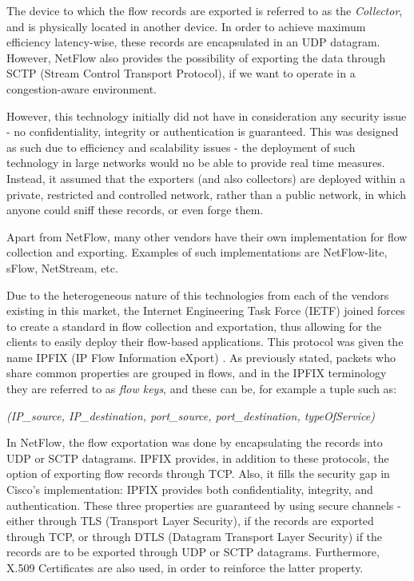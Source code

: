 \documentclass[runningheads,a4paper]{llncs}
\begin{document}
The device to which the flow records are exported is referred to as the \textit{Collector}, and is physically located in another device. In order to achieve maximum efficiency latency-wise, these records are encapsulated in an UDP datagram. However, NetFlow also provides the possibility of exporting the data through SCTP (Stream Control Transport Protocol), if we want to operate in a congestion-aware environment.


However, this technology initially did not have in consideration any security issue - no confidentiality, integrity or authentication is guaranteed. This was designed as such due to efficiency and scalability issues - the deployment of such technology in large networks would no be able to provide real time measures. Instead, it assumed that the exporters (and also collectors) are deployed within a private, restricted and controlled network, rather than a public network, in which anyone could sniff these records, or even forge them.


Apart from NetFlow, many other vendors have their own implementation for flow collection and exporting. Examples of such implementations are NetFlow-lite, sFlow, NetStream, etc.


Due to the heterogeneous nature of this technologies from each of the vendors existing in this market, the Internet Engineering Task Force (IETF) joined forces to create a standard in flow collection and exportation, thus allowing for the clients to easily deploy their flow-based applications. This protocol was given the name IPFIX (IP Flow Information eXport) \cite{Claise2013}. As previously stated, packets who share common properties are grouped in flows, and in the IPFIX terminology they are referred to as \textit{flow keys}, and these can be, for example a tuple such as:


\emph{(IP\_source, IP\_destination, port\_source, port\_destination, typeOfService)}


In NetFlow, the flow exportation was done by  encapsulating the records into UDP or SCTP datagrams. IPFIX provides, in addition to these protocols, the option of exporting flow records through TCP. Also, it fills the security gap in Cisco's implementation: IPFIX provides both confidentiality, integrity, and authentication. These three properties are guaranteed by using secure channels - either through TLS (Transport Layer Security), if the records are exported through TCP, or through DTLS (Datagram Transport Layer Security) if the records are to be exported through UDP or SCTP datagrams. Furthermore, X.509 Certificates are also used, in order to reinforce the latter property.
\end{document}
